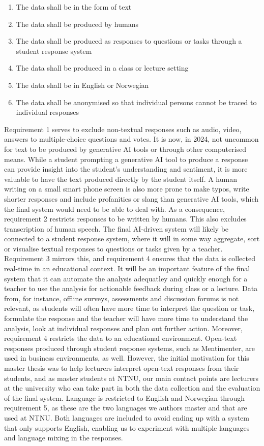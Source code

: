 \begin{enumerate}
    \item The data shall be in the form of text
    \item The data shall be produced by humans 
    \item The data shall be produced as responses to questions or tasks through a student response system
    \item The data shall be produced in a class or lecture setting
    \item The data shall be in English or Norwegian
    \item The data shall be anonymised so that individual persons cannot be traced to individual responses
\end{enumerate}

Requirement 1 serves to exclude non-textual responses such as audio, video, answers to multiple-choice questions and votes. It is now, in 2024, not uncommon for text to be produced by generative AI tools or through other computerised means. While a student prompting a generative AI tool to produce a response can provide insight into the student's understanding and sentiment, it is more valuable to have the text produced directly by the student itself. A human writing on a small smart phone screen is also more prone to make typos, write shorter responses and include profanities or slang than generative AI tools, which the final system would need to be able to deal with. As a consequence, requirement 2 restricts responses to be written by humans. This also excludes transcription of human speech. The final AI-driven system will likely be connected to a student response system, where it will in some way aggregate, sort or visualise textual responses to questions or tasks given by a teacher. Requirement 3 mirrors this, and requirement 4 ensures that the data is collected real-time in an educational context. It will be an important feature of the final system that it can automate the analysis adequatley and quickly enough for a teacher to use the analysis for actionable feedback during class or a lecture. Data from, for instance, offline surveys, assessments and discussion forums is not relevant, as students will often have more time to interpret the question or task, formulate the response and the teacher will have more time to understand the analysis, look at individual responses and plan out further action. Moreover, requirement 4 restricts the data to an educational environment. Open-text responses produced through student response systems, such as Mentimenter, are used in business environments, as well. However, the initial motivation for this master thesis was to help lecturers interpret open-text responses from their students, and as master students at NTNU, our main contact points are lecturers at the university who can take part in both the data collection and the evaluation of the final system. Language is restricted to English and Norwegian through requirement 5, as these are the two languages we authors master and that are used at NTNU. Both languages are included to avoid ending up with a system that only supports English, enabling us to experiment with multiple languages and language mixing in the responses. 